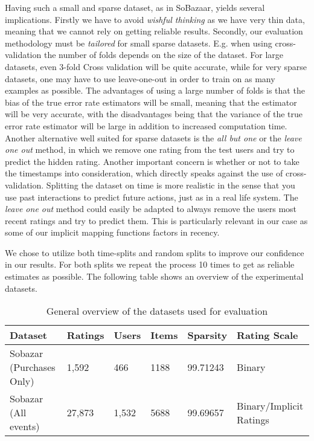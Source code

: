 Having such a small and sparse dataset, as in SoBazaar, yields several
implications. Firstly we have to avoid \emph{wishful thinking} as we have very
thin data, meaning that we cannot rely on getting reliable results. Secondly,
our evaluation methodology must be \emph{tailored} for small sparse datasets.
E.g. when using cross-validation the number of folds depends on the size of the
dataset. For large datasets, even 3-fold Cross validation will be quite
accurate, while for very sparse datasets, one may have to use leave-one-out in
order to train on as many examples as possible. The advantages of using a large
number of folds is that the bias of the true error rate estimators will be
small, meaning that the estimator will be very accurate, with the disadvantages
being that the variance of the true error rate estimator will be large in
addition to increased computation time. Another alternative well suited for
sparse datasets is the \emph{all but one} or the \emph{leave one out} method,
in which we remove one rating from the test users and try to predict the hidden
rating.  Another important concern is whether or not to take the timestamps
into consideration, which directly speaks against the use of cross-validation.
Splitting the dataset on time is more realistic in the sense that you use past
interactions to predict future actions, just as in a real life system. The
\emph{leave one out} method could easily be adapted to always remove the users
most recent ratings and try to predict them. This is particularly relevant in
our case as some of our implicit mapping functions factors in recency.

We chose to utilize both time-splits and random splits to improve our confidence
in our results. For both splits we repeat the process 10 times to get as reliable
estimates as possible. The following table shows an overview of the experimental datasets.

\begin{table}[H]
    \centering
    \begin{tabular}{l l l l l l }
    \toprule
	Dataset						& 	Ratings		& 	Users		& 	Items 		& 	Sparsity	& Rating Scale 				    \\ \midrule
	Sobazar	(Purchases Only) 	&	1,592		&	466			&	1188		&	99.71243	& Binary						\\
	Sobazar (All events)		& 	27,873  	& 	1,532		&	5688		& 	99.69657	& Binary/Implicit Ratings		\\
	\bottomrule
    \end{tabular}
    \caption [Experimental datasets]{General overview of the datasets used for evaluation}
    \label{table:datasets}
\end{table}

